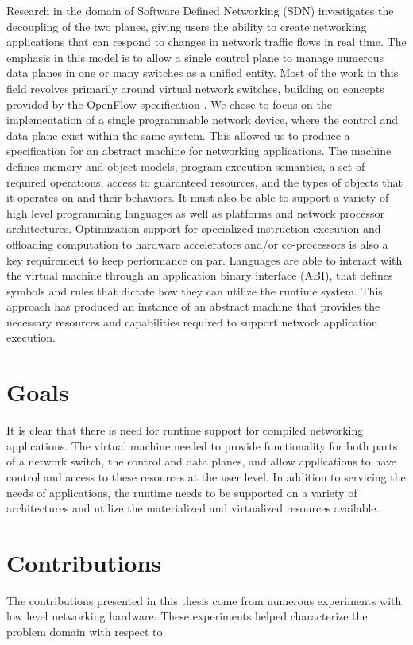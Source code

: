 Research in the domain of Software Defined Networking (SDN) investigates the
decoupling of the two planes, giving users the ability to create networking
applications that can respond to changes in network traffic flows in real time.
The emphasis in this model is to allow a single control plane to manage 
numerous data planes in one or many switches as a unified entity. Most of the 
work in this field revolves primarily around virtual network switches, 
building on concepts provided by the OpenFlow specification \cite{openflow}. 
We chose to focus on the implementation of a single programmable network 
device, where the control and data plane exist within the same system. This 
allowed us to produce a specification for an abstract machine for networking 
applications. The machine defines memory and object models, program execution 
semantics, a set of required operations, access to guaranteed resources, and 
the types of objects that it operates on and their behaviors. It must also be 
able to support a variety of high level programming languages as well as 
platforms and network processor architectures. Optimization support for 
specialized instruction execution and offloading computation to hardware 
accelerators and/or co-processors is also a key requirement to keep 
performance on par. Languages are able to interact with the virtual machine 
through an application binary interface (ABI), that defines symbols and rules 
that dictate how they can utilize the runtime system. This approach has 
produced an instance of an abstract machine that provides the necessary 
resources and capabilities required to support network application execution.


\section{Goals}
\label{intro:goals}
It is clear that there is need for runtime support for compiled
networking applications. The virtual machine needed to provide functionality
for both parts of a network switch, the control and data planes, and allow
applications to have control and access to these resources at the user level.
In addition to servicing the needs of applications, the runtime needs to be
supported on a variety of architectures and utilize the materialized and 
virtualized resources available.

\section{Contributions}
\label{intro:contrib}
The contributions presented in this thesis come from numerous experiments with
low level networking hardware. These experiments helped characterize the 
problem domain with respect to 


